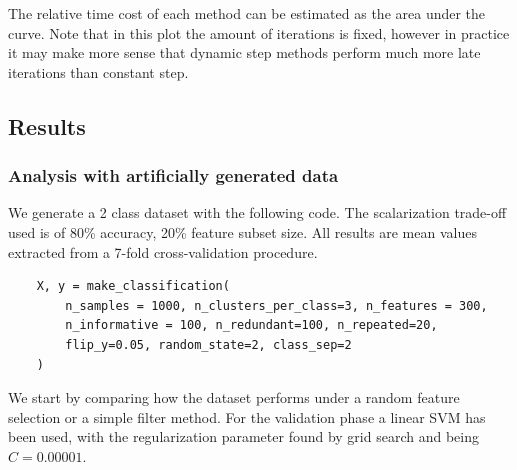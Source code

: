 The relative time cost of each method can be estimated as the area under the curve. Note that in this plot the amount of iterations is fixed, however in practice it may make more sense that dynamic step methods perform much more late iterations than constant step.

\subsection{Results}

\subsubsection*{Analysis with artificially generated data}
\label{sec:ch5.dstep.gen}

We generate a 2 class dataset with the following code. The scalarization trade-off used is of 80\% accuracy, 20\% feature subset size. All results are mean values extracted from a 7-fold cross-validation procedure.

\begin{verbatim}
    X, y = make_classification(
        n_samples = 1000, n_clusters_per_class=3, n_features = 300,
        n_informative = 100, n_redundant=100, n_repeated=20,
        flip_y=0.05, random_state=2, class_sep=2
    )
\end{verbatim}

We start by comparing how the dataset performs under a random feature se\-lec\-tion or a simple filter method. For the validation phase a linear SVM has been used, with the regularization parameter found by grid search and being $C = 0.00001$.

